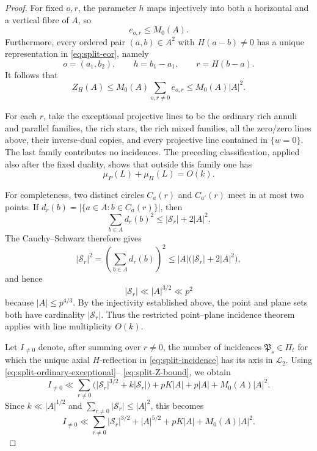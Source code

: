 \documentclass[11pt]{article}
\begin{document}
\begin{proof}
For fixed $o,r$, the parameter $h$ maps injectively into both a horizontal and a vertical fibre of $A$, so
\[
 e_{o,r}\le M_0(A).
\]
Furthermore, every ordered pair $(a,b)\in A^2$ with $H(a-b)\ne0$ has a unique representation in \eqref{eq:split-eor}, namely
\[
 o=(a_1,b_2),\qquad h=b_1-a_1,\qquad r=H(b-a).
\]
It follows that
\begin{equation}
 \label{eq:split-Z-bound}
 Z_H(A)
 \le M_0(A)\sum_{o,r\ne0}e_{o,r}
 \le M_0(A)|A|^2.
\end{equation}

For each $r$, take the exceptional projective lines to be the ordinary rich annuli and parallel families, the rich stars, the rich mixed families, all the zero/zero lines above, their inverse-dual copies, and every projective line contained in $\{w=0\}$.  The last family contributes no incidences.  The preceding classification, applied also after the fixed duality, shows that outside this family one has
\[
 \mu_P(L)+\mu_\Pi(L)=O(k).
\]

For completeness, two distinct circles $C_a(r)$ and $C_{a'}(r)$ meet in at most two points.  If $d_r(b)=|\{a\in A:b\in C_a(r)\}|$, then
\[
\sum_{b\in A}d_r(b)^2  \le |\mathcal S_r|+2|A|^2.
\]
The Cauchy--Schwarz therefore gives
\[
 |\mathcal S_r|^2
 =\left(\sum_{b\in A}d_r(b)\right)^2
 \le |A|\bigl(|\mathcal S_r|+2|A|^2\bigr),
\]
and hence
\[
 |\mathcal S_r|\ll |A|^{3/2}\ll p^2
\]
because $|A|\le p^{4/3}$.  By the injectivity established above, the point and plane sets both have cardinality $|\mathcal S_r|$.  Thus the restricted point--plane incidence theorem \cite[Theorem~8]{MPPRS} applies with line multiplicity $O(k)$.

Let $I_{\ne0}$ denote, after summing over $r\ne0$, the number of incidences $\mathfrak P_s\in\Pi_t$ for which the unique axial $H$-reflection in \eqref{eq:split-incidence} has its axis in $\mathcal L_2$. Using \eqref{eq:split-ordinary-exceptional}--
\eqref{eq:split-Z-bound}, we obtain
\[
 I_{\ne0}
 \ll
 \sum_{r\ne0}\bigl(|\mathcal S_r|^{3/2}+k|\mathcal S_r|\bigr)
 +pK|A|+p|A|+M_0(A)|A|^2.
\]
Since $k\ll |A|^{1/2}$ and $\sum_{r\ne0}|\mathcal S_r|\le |A|^2$, this becomes
\begin{equation}
 \label{eq:split-nonzero-incidences}
 I_{\ne0}
 \ll
 \sum_{r\ne0}|\mathcal S_r|^{3/2}
 +|A|^{5/2}+pK|A|+M_0(A)|A|^2.
\end{equation}


\end{proof}
\end{document}
